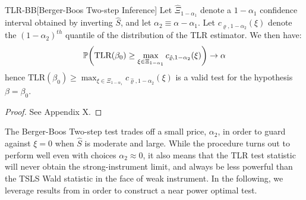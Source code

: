 \begin{propositionp}{TLR-BB}[Berger-Boos Two-step Inference]
\label{prop:tlr-bb}
Let \(\hat \Xi_{1-\alpha_1}\) denote a \(1-\alpha_1\) confidence interval obtained by inverting \(\hat S\), and let \(\alpha_2 \equiv \alpha -\alpha_1 \). Let \(c_{\varrho,1-\alpha_2}(\xi) \) denote the \((1-\alpha_2)^{th}\) {quantile} of the distribution of the TLR estimator.
  We then have:
\begin{align*}
    \P\!\left(\textrm{TLR}(\beta_0) \geq \max_{\xi \in \Xi_{1-\alpha_1}} c_{\hat\varrho,1-\alpha_2}(\xi)\right) \to \alpha
\end{align*} 
hence \(\textrm{TLR}(\beta_0) \geq \max_{\xi \in \Xi_{1-\alpha_1}} c_{\hat\varrho,1-\alpha_2}(\xi)\)  is a valid test for the hypothesis \(\beta=\beta_0\).
\end{propositionp}
\begin{proof}
    See Appendix X.
\end{proof}
\noindent
The Berger-Boos Two-step test trades off a small price, \(\alpha_2\), in order to guard against \(\xi=0\) when \(\hat S\) is moderate and large. While the procedure turns out to perform well even with choices  \(\alpha_2 \approx 0\), it also means that the TLR test statistic will never obtain the strong-instrument limit, and always be less powerful than the TSLS Wald statistic in the face of weak instrument. In the following, we leverage results from \cite{elliottNearlyOptimalTests2015} in order to construct a near power optimal test.


